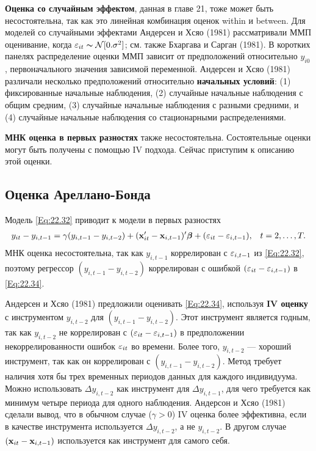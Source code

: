  \textbf{Оценка со случайным эффектом}, данная в главе 21, тоже может быть несостоятельна, так как это линейная комбинация оценок within и between. Для моделей со случайными эффектами Андерсен и Хсяо (1981) рассматривали ММП оценивание, когда $\varepsilon_{it} \thicksim \mathcal N[0. \sigma^2]$; см. также Бхаргава и Сарган (1981). В коротких панелях распределение оценки ММП зависит от предположений относительно $y_{i0}$, первоначального значения зависимой переменной. Андерсен и Хсяо (1981) различали несколько предположений относительно \textbf{начальных условий}: (1) фиксированные начальные наблюдения, (2) случайные начальные наблюдения с общим средним, (3) случайные начальные наблюдения с разными средними, и (4) случайные начальные наблюдения со стационарными распределениями.

\textbf{МНК оценка в первых разностях} также несостоятельна. Состоятельные оценки могут быть получены с помощью IV подхода. Сейчас приступим к описанию этой оценки.

\subsection{Оценка Ареллано-Бонда}
Модель \ref{Eq:22.32} приводит к модели в первых разностях
\begin{align}
& y_{it}-y_{i,t-1}=\gamma (y_{i,t-1} - y_{i,t-2})+(\mathbf{x}'_{it} -\mathbf{x}_{i,t-1})'\bm{\beta} + (\varepsilon_{it}-\varepsilon_{i,t-1}),
&t=2, \dots, T.
\label{Eq:22.34}
\end{align}
МНК оценка несостоятельна, так как $y_{i,t-1}$ коррелирован с $\varepsilon_{i,t-1}$ из \ref{Eq:22.32}, поэтому регрессор $(y_{i,t-1}-y_{i,t-2})$ коррелирован с ошибкой $(\varepsilon_{it}-\varepsilon_{i,t-1})$  в \ref{Eq:22.34}.

Андерсен и Хсяо (1981) предложили оценивать \ref{Eq:22.34}, используя \textbf{IV оценку}  с инструментом $y_{i,t-2}$ для $(y_{i,t-1}-y_{i,t-2})$. Этот инструмент является годным, так как $y_{i,t-2}$ не коррелирован с $(\varepsilon_{it}-\varepsilon_{i,t-1})$ в предположении некоррелированности ошибок $\varepsilon_{it}$ во времени. Более того, $y_{i,t-2}$ --- хороший инструмент, так как он коррелирован с $(y_{i,t-1}-y_{i,t-2})$. Метод требует наличия хотя бы трех временных периодов данных для каждого индивидуума. Можно использовать $\Delta y_{i,t-2}$ как инструмент для $\Delta y_{i,t-1}$, для чего требуется как минимум четыре периода для одного наблюдения. Андерсон и Хсяо (1981) сделали вывод, что в обычном случае ($\gamma > 0$) IV оценка более эффективна, если в качестве инструмента используется $\Delta y_{i,t-2}$, а не $y_{i,t-2}$. В другом случае $(\mathbf{x}_{it}-\mathbf{x}_{i,t-1})$ используется как инструмент для самого себя.

